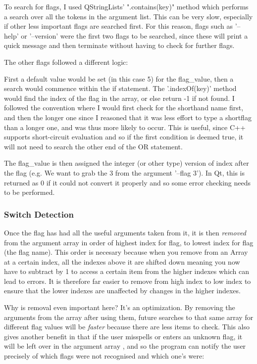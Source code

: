 To search for flags, I used QStringLists' ".contains(key)" method which performs a search over all the tokens in the argument list. This can be very slow, especially if other less important flags are searched first. 
For this reason, flags such as '--help' or '--version' were the first two flags to be searched, since these will print a quick message and then terminate without having to check for further flags.

The other flags followed a different logic:
\begin{frame}[fragile]
\vspace{-10pt}

\end{frame}
 First a default value would be set (in this case 5) for the flag\_value, then a search would commence within the if statement.  The '.indexOf(key)' method would find the index of the flag in the array, or else return -1 if not found. I followed the convention where I would first check for the shorthand name first, and then the longer one since I reasoned that it was less effort to type a shortflag than a longer one, and was thus more likely to occur. This is useful, since C++ supports short-circuit evaluation and so if the first condition is deemed true, it will not need to search the other end of the OR statement.

The flag\_value is then assigned the integer (or other type) version of index after the flag (e.g. We want to grab the 3 from the argument '--flag 3'). In Qt, this is returned as 0 if it could not convert it properly and so some error checking needs to be performed.

\subsubsection{Switch Detection}
Once the flag has had all the useful arguments taken from it, it is then {\it removed} from the argument array in order of highest index for flag, to lowest index for flag (the flag name). This order is necesary because when you remove from an Array at a certain index, all the indexes above it are shifted down meaning you now have to subtract by 1 to access a certain item from the higher indexes which can lead to errors. It is therefore far easier to remove from high index to low index to ensure that the lower indexes are unaffected by changes in the higher indexes.

Why is removal even important here? It's an optimization. By removing the arguments from the array after using them, future searches to that same array for different flag values will be {\it faster} because there are less items to check. This also gives another benefit in that if the user misspells or enters an unknown flag, it will be left over in the argument array , and so the program can notify the user precisely of which flags were not recognised and which one's were:
\begin{frame}[fragile]

\end{frame}

